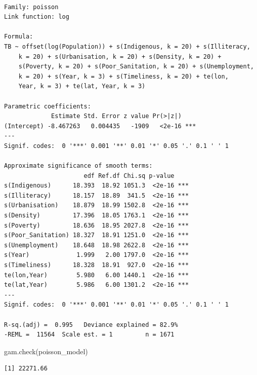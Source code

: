 \documentclass[
  letterpaper,
  DIV=11,
  numbers=noendperiod]{scrartcl}
\newenvironment{Shaded}{\begin{snugshade}}{\end{snugshade}}
\newcommand{\CommentTok}[1]{\textcolor[rgb]{0.37,0.37,0.37}{#1}}
\newcommand{\FunctionTok}[1]{\textcolor[rgb]{0.28,0.35,0.67}{#1}}
\newcommand{\NormalTok}[1]{\textcolor[rgb]{0.00,0.23,0.31}{#1}}
\newcommand{\SpecialCharTok}[1]{\textcolor[rgb]{0.37,0.37,0.37}{#1}}
\begin{document}
\begin{verbatim}

Family: poisson 
Link function: log 

Formula:
TB ~ offset(log(Population)) + s(Indigenous, k = 20) + s(Illiteracy, 
    k = 20) + s(Urbanisation, k = 20) + s(Density, k = 20) + 
    s(Poverty, k = 20) + s(Poor_Sanitation, k = 20) + s(Unemployment, 
    k = 20) + s(Year, k = 3) + s(Timeliness, k = 20) + te(lon, 
    Year, k = 3) + te(lat, Year, k = 3)

Parametric coefficients:
             Estimate Std. Error z value Pr(>|z|)    
(Intercept) -8.467263   0.004435   -1909   <2e-16 ***
---
Signif. codes:  0 '***' 0.001 '**' 0.01 '*' 0.05 '.' 0.1 ' ' 1

Approximate significance of smooth terms:
                      edf Ref.df Chi.sq p-value    
s(Indigenous)      18.393  18.92 1051.3  <2e-16 ***
s(Illiteracy)      18.157  18.89  341.5  <2e-16 ***
s(Urbanisation)    18.879  18.99 1502.8  <2e-16 ***
s(Density)         17.396  18.05 1763.1  <2e-16 ***
s(Poverty)         18.636  18.95 2027.8  <2e-16 ***
s(Poor_Sanitation) 18.327  18.91 1251.0  <2e-16 ***
s(Unemployment)    18.648  18.98 2622.8  <2e-16 ***
s(Year)             1.999   2.00 1797.0  <2e-16 ***
s(Timeliness)      18.328  18.91  927.0  <2e-16 ***
te(lon,Year)        5.980   6.00 1440.1  <2e-16 ***
te(lat,Year)        5.986   6.00 1301.2  <2e-16 ***
---
Signif. codes:  0 '***' 0.001 '**' 0.01 '*' 0.05 '.' 0.1 ' ' 1

R-sq.(adj) =  0.995   Deviance explained = 82.9%
-REML =  11564  Scale est. = 1         n = 1671
\end{verbatim}

\begin{Shaded}
\begin{Highlighting}[]
\FunctionTok{gam.check}\NormalTok{(poisson\_model)}
\end{Highlighting}
\end{Shaded}

\begin{Shaded}
\end{Shaded}

\begin{verbatim}
[1] 22271.66
\end{verbatim}
\end{document}
